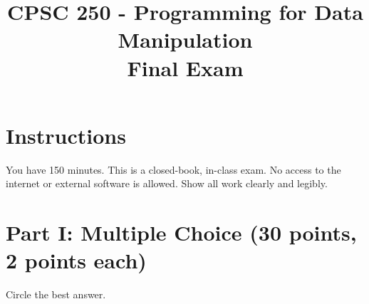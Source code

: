 \documentclass[12pt]{article}
\title{CPSC 250 - Programming for Data Manipulation\\Final Exam}
\date{}
\begin{document}
\maketitle

\section*{Instructions}
You have 150 minutes. This is a closed-book, in-class exam. No access to the internet or external software is allowed. Show all work clearly and legibly.

\newpage

\section*{Part I: Multiple Choice (30 points, 2 points each)}
Circle the best answer.
\end{document}
